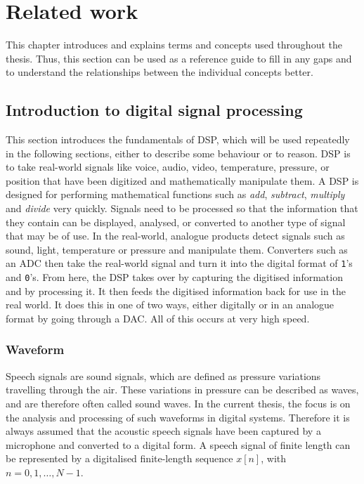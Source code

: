 \chapter{Related work}
\label{ch:Related-Work}
This chapter introduces and explains terms and concepts used throughout the thesis. Thus, this section can be used as a reference guide to fill in any gaps and to understand the relationships between the individual concepts better.

\section{Introduction to digital signal processing}
\label{sec:Intro-DSP}
This section introduces the fundamentals of \gls{DSP}, which will be used repeatedly in the following sections, either to describe some behaviour or to reason. 
\newline
\newline
\gls{DSP} is to take real-world signals like voice, audio, video, temperature, pressure, or position that have been digitized and mathematically manipulate them. A \gls{DSP} is designed for performing mathematical functions such as \textit{add}, \textit{subtract}, \textit{multiply} and \textit{divide} very quickly.
\newline
\newline
Signals need to be processed so that the information that they contain can be displayed, analysed, or converted to another type of signal that may be of use. In the real-world, analogue products detect signals such as sound, light, temperature or pressure and manipulate them. Converters such as an \gls{ADC} then take the real-world signal and turn it into the digital format of \texttt{1}'s and \texttt{0}'s. From here, the \gls{DSP} takes over by capturing the digitised information and by processing it. It then feeds the digitised information back for use in the real world. It does this in one of two ways, either digitally or in an analogue format by going through a \gls{DAC}. All of this occurs at very high speed.\footnotemark
{}

\subsection{Waveform}
\label{sub:Waveform}
Speech signals are sound signals, which are defined as pressure variations travelling through the air. These variations in pressure can be described as waves, and are therefore often called sound waves. In the current thesis, the focus is on the analysis and processing of such waveforms in digital systems. Therefore it is always assumed that the acoustic speech signals have been captured by a microphone and converted to a digital form.
\newline
\newline
A speech signal of finite length can be represented by a digitalised finite-length sequence $x[n]$, with $n = 0, 1, \dots, N-1$.

